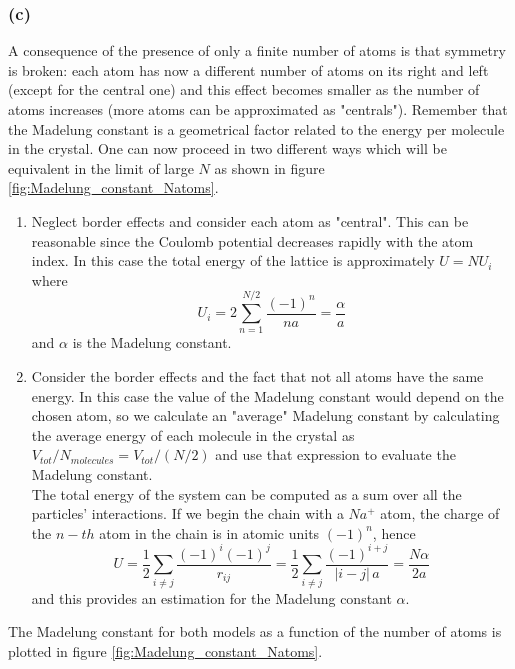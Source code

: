 \subsubsection*{(c)}
A consequence of the presence of only a finite number of atoms is that symmetry is broken: each atom has now a different number of atoms on its right and left (except for the central one) and this 
effect becomes smaller as the number of atoms increases (more atoms can be approximated as "centrals"). Remember that the Madelung constant is a geometrical factor related to the energy per molecule in the crystal. 
One can now proceed in two different ways which will be equivalent in the limit of large $N$ as shown in figure \ref{fig:Madelung_constant_Natoms}.
\begin{enumerate}
    \item Neglect border effects and consider each atom as "central". This can be reasonable since the Coulomb potential decreases rapidly with the atom index. In this case the total energy of the lattice is approximately
    $U = NU_i$ where
    $$ U_i = 2\sum_{n=1}^{N/2}\frac{(-1)^n}{n a} = \frac{\alpha}{a}$$
    and $\alpha$ is the Madelung constant.
    \item Consider the border effects and the fact that not all atoms have the same energy. In this case the value of the Madelung constant would depend on the chosen atom, so we calculate an "average" Madelung constant by calculating the average energy of each molecule in the crystal as $V_{tot}/N_{molecules} = V_{tot}/(N/2)$ and use that expression to evaluate the Madelung constant. \\
        The total energy of the system can be computed as a sum over all the particles' interactions. If we begin the chain with a $Na^+$ atom, the charge of the $n-th$ atom in the chain is in atomic units $(-1)^n$, hence
        $$U = \frac{1}{2} \sum_{i \neq j} \frac{(-1)^i(-1)^j}{r_{ij}} = \frac{1}{2} \sum_{i \neq j} \frac{(-1)^{i+j}}{|i-j| \, a} =
        \frac{N\alpha}{2a}$$
        and this provides an estimation for the Madelung constant $\alpha$.
\end{enumerate} 
The Madelung constant for both models as a function of the number of atoms is plotted in figure \ref{fig:Madelung_constant_Natoms}.

